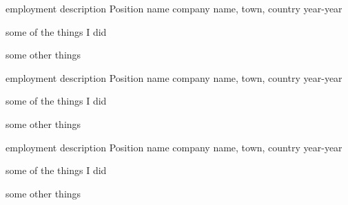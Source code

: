 \begin{cventries}
\cventryLongLocation
    {employment description}
    {Position name}
    {company name, town, country}
    {year-year}
    {
      \begin{cvitems}
        \item{some of the things I did}
        \item{some other things}
      \end{cvitems}
   }%
\cventryLongLocation
    {employment description}
    {Position name}
    {company name, town, country}
    {year-year}
    {
      \begin{cvitems}
        \item{some of the things I did}
        \item{some other things}
      \end{cvitems}
   }%
\cventryLongLocation
    {employment description}
    {Position name}
    {company name, town, country}
    {year-year}
    {
      \begin{cvitems}
        \item{some of the things I did}
        \item{some other things}
      \end{cvitems}
   }%
\end{cventries}
